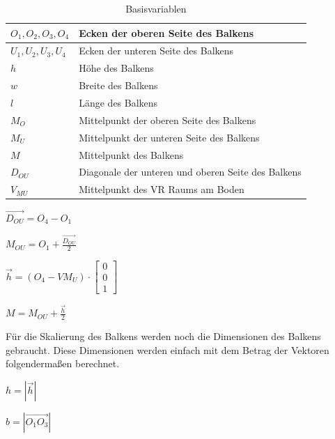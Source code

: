 \begin{table}[]
    \centering
    \begin{tabular}{|l|l|}
        \hline
        $O_{1}, O_{2}, O_{3}, O_{4}$ & Ecken der oberen Seite des Balkens                 \\ \hline
        $U_{1}, U_{2}, U_{3}, U_{4}$ & Ecken der unteren Seite des Balkens                \\ \hline
        $h$                          & Höhe des Balkens                                   \\ \hline
        $w$                          & Breite des Balkens                                 \\ \hline
        $l$                          & Länge des Balkens                                  \\ \hline
        $M_{O}$                      & Mittelpunkt der oberen Seite des Balkens           \\ \hline
        $M_{U}$                      & Mittelpunkt der unteren Seite des Balkens          \\ \hline
        $M$                          & Mittelpunkt des Balkens                            \\ \hline
        $D_{OU}$                     & Diagonale der unteren und oberen Seite des Balkens \\ \hline
        $V_{MU}$                     & Mittelpunkt des VR Raums am Boden                  \\ \hline
    \end{tabular}
    \caption{Basisvariablen}
    \label{tab:variables}
\end{table}

\pagebreak

$\vec{D_{OU}} = O_{4} - O_{1}$

$M_{OU} = O_{1} +  \frac{\vec{D_{OU}}}{2} $

$\vec{h} = (O_{4} - VM_{U}) \cdot \begin{bmatrix} 0 \\ 0 \\ 1  \end{bmatrix}$

$M = M_{OU} + \frac{\vec{h}}{2}$

Für die Skalierung des Balkens werden noch die Dimensionen des Balkens gebraucht.
Diese Dimensionen werden einfach mit dem Betrag der Vektoren folgendermaßen berechnet.

$h = |\vec{h}|$

$b = |\vec{O_{1}O_{3}}|$

